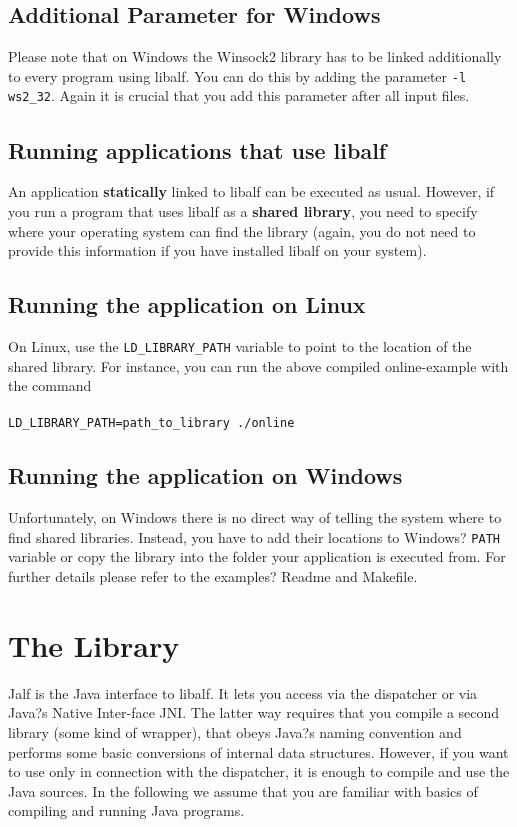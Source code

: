 \subsection*{Additional Parameter for Windows}
Please note that on Windows the Winsock2 library has to be linked additionally to every program using libalf. You can do this by adding the parameter \texttt{-l ws2\_32}. Again it is crucial that you add this parameter after all input files.


\subsection{Running applications that use libalf}
An application \textbf{statically} linked to libalf can be executed as usual. However, if you run a program that uses libalf as a \textbf{shared library}, you need to specify where your operating system can find the library (again, you do not need to provide this information if you have installed libalf on your system).
\subsection{Running the application on Linux}
On Linux, use the \texttt{LD\_LIBRARY\_PATH} variable to point to the location of the shared library. For instance, you can run the above compiled online-example with the command
\\ \\
\texttt{LD\_LIBRARY\_PATH=path\_to\_library ./online}

\subsection{Running the application on Windows}
Unfortunately, on Windows there is no direct way of telling the system where to find shared libraries. Instead, you have to add their locations to Windows? \texttt{PATH} variable or copy the library into the folder your application is executed from. For further details please refer to the examples? Readme and Makefile.

\section{The \jalf \java Library}
Jalf is the Java interface to libalf. It lets you access \libalf via the dispatcher or via Java?s Native Inter-face JNI. The latter way requires that you compile a second \cpp library (some kind of wrapper), that obeys Java?s naming convention and performs some basic conversions of internal data structures. However, if you want to use \jalf only in connection with the dispatcher, it is enough to compile and use the Java sources.
In the following we assume that you are familiar with basics of compiling and running Java programs.

